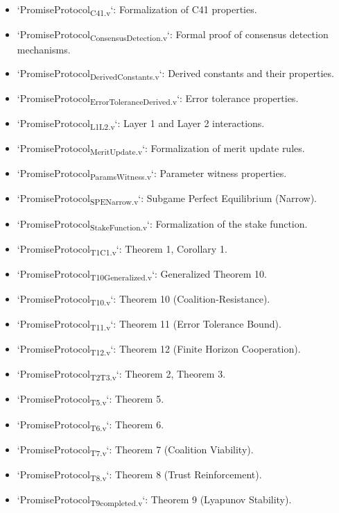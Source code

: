 \documentclass[11pt]{article}
\begin{document}
\begin{itemize}
\item `PromiseProtocol\textsubscript{C41.v}`: Formalization of C41 properties.
\item `PromiseProtocol\textsubscript{ConsensusDetection.v}`: Formal proof of consensus detection mechanisms.
\item `PromiseProtocol\textsubscript{DerivedConstants.v}`: Derived constants and their properties.
\item `PromiseProtocol\textsubscript{ErrorTolerance}\textsubscript{Derived.v}`: Error tolerance properties.
\item `PromiseProtocol\textsubscript{L1}\textsubscript{L2.v}`: Layer 1 and Layer 2 interactions.
\item `PromiseProtocol\textsubscript{MeritUpdate.v}`: Formalization of merit update rules.
\item `PromiseProtocol\textsubscript{ParamsWitness.v}`: Parameter witness properties.
\item `PromiseProtocol\textsubscript{SPE}\textsubscript{Narrow.v}`: Subgame Perfect Equilibrium (Narrow).
\item `PromiseProtocol\textsubscript{StakeFunction.v}`: Formalization of the stake function.
\item `PromiseProtocol\textsubscript{T1}\textsubscript{C1.v}`: Theorem 1, Corollary 1.
\item `PromiseProtocol\textsubscript{T10}\textsubscript{Generalized.v}`: Generalized Theorem 10.
\item `PromiseProtocol\textsubscript{T10.v}`: Theorem 10 (Coalition-Resistance).
\item `PromiseProtocol\textsubscript{T11.v}`: Theorem 11 (Error Tolerance Bound).
\item `PromiseProtocol\textsubscript{T12.v}`: Theorem 12 (Finite Horizon Cooperation).
\item `PromiseProtocol\textsubscript{T2}\textsubscript{T3.v}`: Theorem 2, Theorem 3.
\item `PromiseProtocol\textsubscript{T5.v}`: Theorem 5.
\item `PromiseProtocol\textsubscript{T6.v}`: Theorem 6.
\item `PromiseProtocol\textsubscript{T7.v}`: Theorem 7 (Coalition Viability).
\item `PromiseProtocol\textsubscript{T8.v}`: Theorem 8 (Trust Reinforcement).
\item `PromiseProtocol\textsubscript{T9}\textsubscript{completed.v}`: Theorem 9 (Lyapunov Stability).
\end{itemize}
\end{document}
